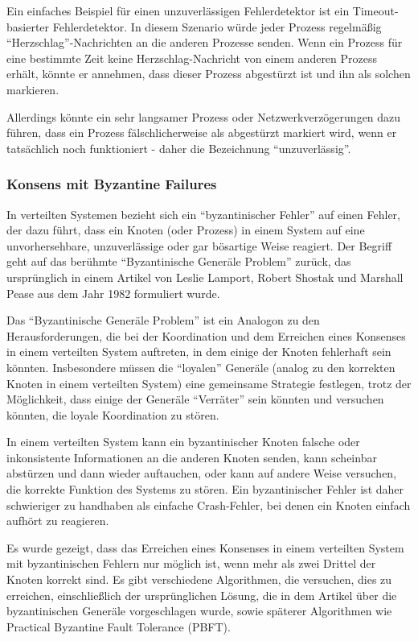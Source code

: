 Ein einfaches Beispiel für einen unzuverlässigen Fehlerdetektor ist ein Timeout-basierter Fehlerdetektor. In diesem Szenario würde jeder Prozess regelmäßig \enquote{Herzschlag}-Nachrichten an die anderen Prozesse senden. Wenn ein Prozess für eine bestimmte Zeit keine Herzschlag-Nachricht von einem anderen Prozess erhält, könnte er annehmen, dass dieser Prozess abgestürzt ist und ihn als solchen markieren.

Allerdings könnte ein sehr langsamer Prozess oder Netzwerkverzögerungen dazu führen, dass ein Prozess fälschlicherweise als abgestürzt markiert wird, wenn er tatsächlich noch funktioniert - daher die Bezeichnung \enquote{unzuverlässig}.

\subsubsection{Konsens mit Byzantine Failures}
In verteilten Systemen bezieht sich ein \enquote{byzantinischer Fehler} auf einen Fehler, der dazu führt, dass ein Knoten (oder Prozess) in einem System auf eine unvorhersehbare, unzuverlässige oder gar bösartige Weise reagiert. Der Begriff geht auf das berühmte \enquote{Byzantinische Generäle Problem} zurück, das ursprünglich in einem Artikel von Leslie Lamport, Robert Shostak und Marshall Pease aus dem Jahr 1982 formuliert wurde.

Das \enquote{Byzantinische Generäle Problem} ist ein Analogon zu den Herausforderungen, die bei der Koordination und dem Erreichen eines Konsenses in einem verteilten System auftreten, in dem einige der Knoten fehlerhaft sein könnten. Insbesondere müssen die \enquote{loyalen} Generäle (analog zu den korrekten Knoten in einem verteilten System) eine gemeinsame Strategie festlegen, trotz der Möglichkeit, dass einige der Generäle \enquote{Verräter} sein könnten und versuchen könnten, die loyale Koordination zu stören.

In einem verteilten System kann ein byzantinischer Knoten falsche oder inkonsistente Informationen an die anderen Knoten senden, kann scheinbar abstürzen und dann wieder auftauchen, oder kann auf andere Weise versuchen, die korrekte Funktion des Systems zu stören. Ein byzantinischer Fehler ist daher schwieriger zu handhaben als einfache Crash-Fehler, bei denen ein Knoten einfach aufhört zu reagieren.

Es wurde gezeigt, dass das Erreichen eines Konsenses in einem verteilten System mit byzantinischen Fehlern nur möglich ist, wenn mehr als zwei Drittel der Knoten korrekt sind. Es gibt verschiedene Algorithmen, die versuchen, dies zu erreichen, einschließlich der ursprünglichen Lösung, die in dem Artikel über die byzantinischen Generäle vorgeschlagen wurde, sowie späterer Algorithmen wie Practical Byzantine Fault Tolerance (PBFT).

